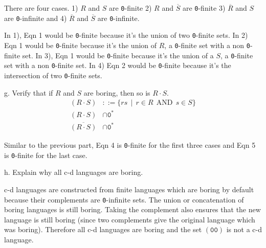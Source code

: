 \documentclass[12pt]{article}
\begin{document}
\par{There are four cases. 1) $R$ and $S$ are \texttt{0}-finite 2) $R$ and $\overline{S}$ are \texttt{0}-finite 3) $\overline{R}$ and $S$ are \texttt{0}-infinite and 4) $\overline{R}$ and $\overline{S}$ are \texttt{0}-infinite.}
\par{In 1), Eqn 1 would be \texttt{0}-finite because it's the union of two \texttt{0}-finite sets. In 2) Eqn 1 would be \texttt{0}-finite because it's the union of $R$, a \texttt{0}-finite set with a non \texttt{0}-finite set. In 3), Eqn 1 would be \texttt{0}-finite because it's the union of a $S$, a \texttt{0}-finite set with a non \texttt{0}-finite set. In 4) Eqn 2 would be \texttt{0}-finite because it's the intersection of two \texttt{0}-finite sets.}
\newline
\par{g. Verify that if $R$ and $S$ are boring, then so is $R \cdot S$.}
\begin{align}
(R \cdot S) &::= \{rs\:\:|\:\:r \in R\:\:\text{AND}\:\:s \in S\} \\
(R \cdot S) &\cap \texttt{0}^* \\
\overline{(R \cdot S)} &\cap \texttt{0}^*
\end{align}
\par{Similar to the previous part, Eqn 4 is \texttt{0}-finite for the first three cases and Eqn 5 is \texttt{0}-finite for the last case.}
\newline
\par{h. Explain why all c-d languages are boring.}
\par{c-d languages are constructed from finite languages which are boring by default because their complements are \texttt{0}-infinite sets. The union or concatenation of boring languages is still boring. Taking the complement also ensures that the new language is still boring (since two complements give the original language which was boring). Therefore all c-d languages are boring and the set $(\texttt{00})$ is not a c-d language.}
\end{document}
